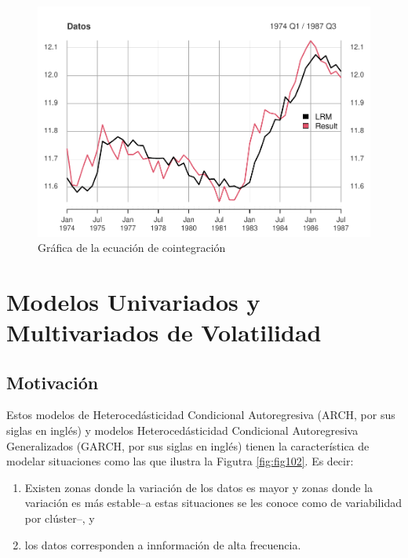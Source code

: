 \documentclass[
]{book}
\begin{document}
\begin{figure}

{\centering \includegraphics[width=0.95\linewidth]{Notas-Series-Tiempo_files/figure-latex/fig92-1} 

}

\caption{Gráfica de la ecuación de cointegración}\label{fig:fig92}
\end{figure}

\hypertarget{modelos-univariados-y-multivariados-de-volatilidad}{%
\chapter{Modelos Univariados y Multivariados de Volatilidad}\label{modelos-univariados-y-multivariados-de-volatilidad}}

\hypertarget{motivaciuxf3n-1}{%
\section{Motivación}\label{motivaciuxf3n-1}}

Estos modelos de Heterocedásticidad Condicional Autoregresiva (ARCH, por sus siglas en inglés) y modelos Heterocedásticidad Condicional Autoregresiva Generalizados (GARCH, por sus siglas en inglés) tienen la característica de modelar situaciones como las que ilustra la Figutra \ref{fig:fig102}. Es decir:

\begin{enumerate}
\def\labelenumi{\arabic{enumi})}
\item
  Existen zonas donde la variación de los datos es mayor y zonas donde la variación es más estable--a estas situaciones se les conoce como de variabilidad por clúster--, y
\item
  los datos corresponden a innformación de alta frecuencia.
\end{enumerate}
\end{document}
